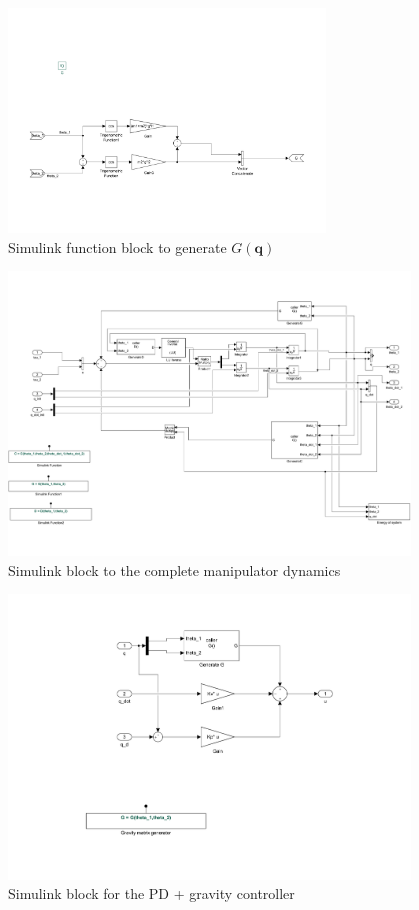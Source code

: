 \documentclass[a4paper]{scrartcl}
\begin{document}
\begin{figure}[ht]
	\centering
	\includegraphics[width=0.75\textwidth]{fig/G_func.pdf}
	\caption{Simulink function block to generate $G(\bm{q})$}
	\label{fig:genG}
\end{figure}
\begin{figure}[ht]
	\centering
	\includegraphics[width=0.95\textwidth]{fig/dynamics.pdf}
	\caption{Simulink block to the complete manipulator dynamics}
	\label{fig:dynamics}
\end{figure}
\begin{figure}[ht]
	\centering
	\includegraphics[width=0.95\textwidth]{fig/PDgravity.pdf}
	\caption{Simulink block for the PD + gravity controller}
	\label{fig:PDgravity}
\end{figure}
\end{document}
